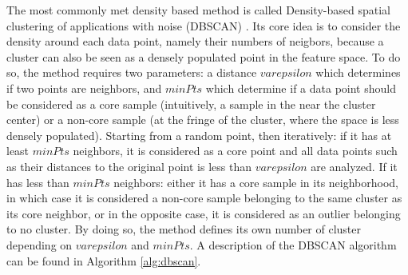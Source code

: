 \documentclass[a4paper]{report}
\begin{document}
    The most commonly met density based method is called Density-based spatial clustering of applications with noise (DBSCAN) \cite{ester1996density}. Its core idea is to consider the density around each data point, namely their numbers of neigbors, because a cluster can also be seen as a densely populated point in the feature space. To do so, the method requires two parameters: a distance $varepsilon$ which determines if two points are neighbors, and $minPts$ which determine if a data point should be considered as a core sample (intuitively, a sample in the near the cluster center) or a non-core sample (at the fringe of the cluster, where the space is less densely populated). Starting from a random point, then iteratively: if it has at least $minPts$ neighbors, it is considered as a core point and all data points such as their distances to the original point is less than $varepsilon$ are analyzed. If it has less than $minPts$ neighbors: either it has a core sample in its neighborhood, in which case it is considered a non-core sample belonging to the same cluster as its core neighbor, or in the opposite case, it is considered as an outlier belonging to no cluster. By doing so, the method defines its own number of cluster depending on $varepsilon$ and $minPts$. A description of the DBSCAN algorithm can be found in Algorithm \ref{alg:dbscan}. 
\end{document}
